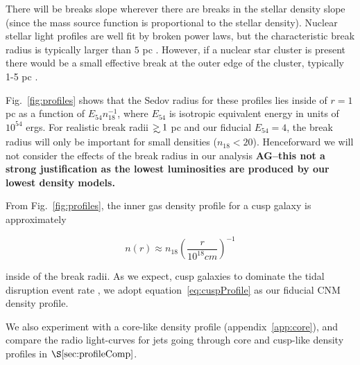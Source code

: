 \documentclass[usenatbib,fleqn]{mnras}
\newcommand\gsim{\mathrel{\rlap{\lower4pt\hbox{\hskip1pt$\sim$}}
    \raise1pt\hbox{$>$}}}
\begin{document}
There will be breaks slope wherever there are breaks in the stellar
density slope (since the mass source function is proportional to the
stellar density).  Nuclear stellar light profiles are well fit by
broken power laws, but the characteristic break radius is typically
larger than $5 $ pc \citep{Lauer+2007}. However, if a nuclear star
cluster is present there would be a small effective break at the outer
edge of the cluster, typically 1-5 pc \citep{Georgiev+2014}.

Fig.~\ref{fig:profiles} shows that the Sedov radius for these profiles
lies inside of $r=1$ pc as a function of $E_{54} n_{18}^{-1}$, where
$E_{54}$ is isotropic equivalent energy in units of $10^{54}$
ergs. For realistic break radii $\gsim 1$ pc and our fiducial
$E_{54}=4$, the break radius will only be important for small
densities ($n_{18}<20$). Henceforward we will not consider the effects
of the break radius in our analysis {\bf AG--this not a strong
  justification as the lowest luminosities are produced by our lowest
  density models.}

From Fig.~\ref{fig:profiles}, the inner gas density profile for a cusp
galaxy is approximately

\begin{equation}
n(r) \approx n_{18} \left(\frac{r}{10^{18} cm}\right)^{-1}
\label{eq:cuspProfile}
\end{equation}

inside of the break radii. As we expect, cusp galaxies to dominate the
tidal disruption event rate \citep{Stone&Metzger2015}, we adopt
equation~\eqref{eq:cuspProfile} as our fiducial CNM density profile.

We also experiment with a core-like density profile
(appendix~\ref{app:core}), and compare the radio light-curves for jets
going through core and cusp-like density profiles in
$\S\ref{sec:profileComp}$.
\end{document}
